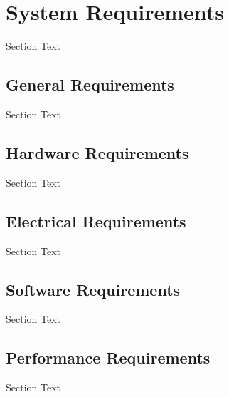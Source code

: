 %

\setcounter{section}{2}
\section{System Requirements}
Section Text


\break
\subsection{General Requirements}
Section Text


\break
\subsection{Hardware Requirements}
Section Text


\break
\subsection{Electrical Requirements}
Section Text


\break
\subsection{Software Requirements}
Section Text


\break
\subsection{Performance Requirements}
Section Text


	
%